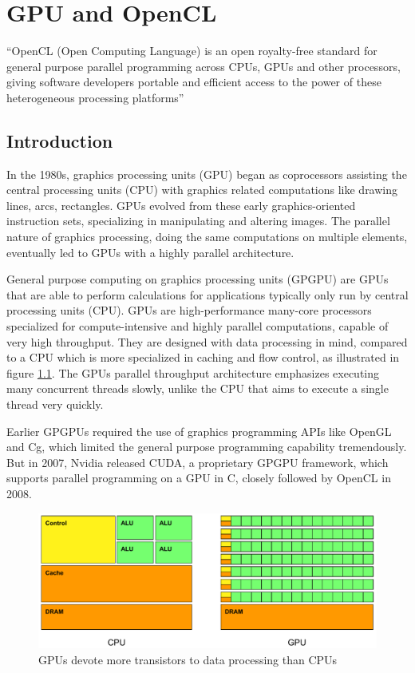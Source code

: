 \chapter{GPU and OpenCL}
\label{chap:arch}
``OpenCL (Open Computing Language) is an open royalty-free standard
for general purpose parallel programming across CPUs, GPUs and other
processors, giving software developers portable and efficient access
to the power of these heterogeneous processing platforms''
\cite{cl-spec}

\section{Introduction}

In the 1980s, graphics processing units (GPU) began as coprocessors
assisting the central processing units (CPU) with graphics related
computations like drawing lines, arcs, rectangles. GPUs evolved from
these early graphics-oriented instruction sets, specializing in
manipulating and altering images. The parallel nature of graphics
processing, doing the same computations on multiple elements,
eventually led to GPUs with a highly parallel architecture.

General purpose computing on graphics processing units (GPGPU) are
GPUs that are able to perform calculations for applications typically
only run by central processing units (CPU). GPUs are high-performance
many-core processors specialized for compute-intensive and highly
parallel computations, capable of very high throughput. They are
designed with data processing in mind, compared to a CPU which is more
specialized in caching and flow control, as illustrated in figure
\ref{fig:cpu-vs-gpu}. The GPUs parallel throughput architecture
emphasizes executing many concurrent threads slowly, unlike the CPU
that aims to execute a single thread very quickly.

Earlier GPGPUs required the use of graphics programming APIs like
OpenGL and Cg, which limited the general purpose programming
capability tremendously. But in 2007, Nvidia released CUDA, a
proprietary GPGPU framework, which supports parallel programming on a
GPU in C, closely followed by OpenCL in 2008.

\begin{figure}
  \includegraphics[width=\textwidth]{images/cpu-vs-gpu.pdf}
  \caption{GPUs devote more transistors to data processing than CPUs}
  \label{fig:cpu-vs-gpu}
\end{figure}


